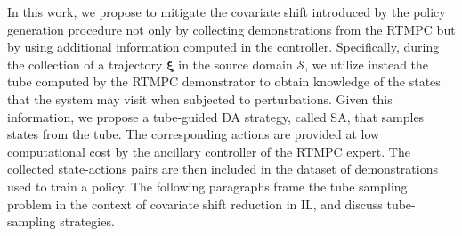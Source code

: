 In this work, we propose to mitigate the covariate shift introduced by the policy generation procedure not only by collecting demonstrations from the \ac{RTMPC} but by using additional information computed in the controller.
Specifically, during the collection of a trajectory $\boldsymbol{\xi}$ in the source domain $\mathcal{S}$, we utilize instead the tube computed by the \ac{RTMPC} demonstrator to obtain knowledge of the states that the system may visit when subjected to perturbations. Given this information, we propose a tube-guided \ac{DA} strategy, called \acf{SA}, that samples states from the tube. The corresponding actions are provided at low computational cost by the ancillary controller of the \ac{RTMPC} expert. The collected state-actions pairs are then included in the dataset of demonstrations used to train a policy. The following paragraphs frame the tube sampling problem in the context of covariate shift reduction in \ac{IL}, and discuss tube-sampling strategies. %

